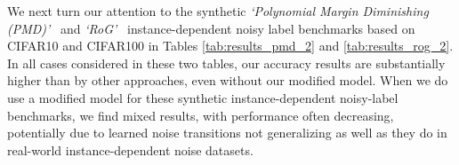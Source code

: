 \documentclass[10pt,twocolumn,letterpaper]{article}
\begin{document}
We next turn our attention to the synthetic \textit{`Polynomial Margin Diminishing (PMD)'}~\cite{zhang2020learning} and \textit{`RoG'}~\cite{lee2019robust} instance-dependent noisy label benchmarks based on CIFAR10 and CIFAR100 in Tables \ref{tab:results_pmd_2} and \ref{tab:results_rog_2}. In all cases considered in these two tables, our accuracy results are substantially higher than by other approaches, even without our modified model. When we do use a modified model for these synthetic instance-dependent noisy-label benchmarks, we find mixed results, with performance often decreasing, potentially due to learned noise transitions not generalizing as well as they do in real-world instance-dependent noise datasets.

\begin{table*}[ht!]
    \begin{center}
    \end{center}
    \caption{Test accuracy (\%) for Polynomial Margin Diminishing Noise \cite{zhang2020learning}. Top methods are in \textbf{bold}.} 
    \label{tab:results_pmd_2}
\end{table*}
\end{document}
